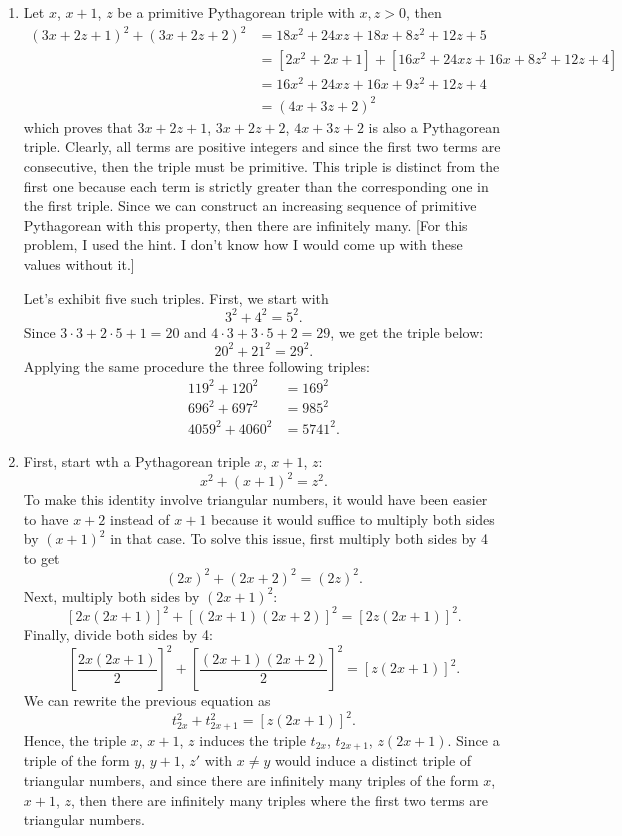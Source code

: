 \begin{solution}
    \begin{enumerate}
        \item Let $x$, $x + 1$, $z$ be a primitive Pythagorean triple with $x,z > 0$, then
        \begin{align*}
            (3x + 2z + 1)^2 + (3x + 2z + 2)^2 &= 18x^2 + 24xz + 18x + 8z^2 + 12z + 5 \\
            &= [2x^2 + 2x + 1] + [16x^2 + 24xz + 16x + 8z^2 + 12z + 4] \\
            &= 16x^2 + 24xz + 16x + 9z^2 + 12z + 4 \\
            &= (4x + 3z + 2)^2
        \end{align*}
        which proves that $3x + 2z + 1$, $3x + 2z + 2$, $4x + 3z + 2$ is also a Pythagorean triple. Clearly, all terms are positive integers and since the first two terms are consecutive, then the triple must be primitive. This triple is distinct from the first one because each term is strictly greater than the corresponding one in the first triple. Since we can construct an increasing sequence of primitive Pythagorean with this property, then there are infinitely many. [For this problem, I used the hint. I don't know how I would come up with these values without it.]

        Let's exhibit five such triples. First, we start with
        $$3^2 + 4^2 = 5^2.$$
        Since $3\cdot 3 + 2 \cdot 5 + 1 = 20$ and $4 \cdot 3 + 3\cdot 5 + 2 = 29$, we get the triple below:
        $$20^2 + 21^2 = 29^2.$$
        Applying the same procedure the three following triples:
        \begin{align*}
            119^2 + 120^2 &= 169^2 \\
            696^2 + 697^2 &= 985^2 \\
            4059^2 + 4060^2 &= 5741^2.
        \end{align*}
        \item First, start wth a Pythagorean triple $x$, $x + 1$, $z$:
        $$x^2 + (x + 1)^2 = z^2.$$
        To make this identity involve triangular numbers, it would have been easier to have $x + 2$ instead of $x + 1$ because it would suffice to multiply both sides by $(x + 1)^2$ in that case. To solve this issue, first multiply both sides by 4 to get
        $$(2x)^2 + (2x + 2)^2 = (2z)^2.$$
        Next, multiply both sides by $(2x + 1)^2$:
        $$[2x(2x + 1)]^2 + [(2x + 1)(2x + 2)]^2 = [2z(2x + 1)]^2.$$
        Finally, divide both sides by 4:
        $$\left[\frac{2x(2x + 1)}{2}\right]^2 + \left[\frac{(2x + 1)(2x + 2)}{2}\right]^2 = [z(2x + 1)]^2.$$
        We can rewrite the previous equation as
        $$t_{2x}^2 + t_{2x + 1}^2 = [z(2x + 1)]^2.$$
        Hence, the triple $x$, $x + 1$, $z$ induces the triple $t_{2x}$, $t_{2x + 1}$, $z(2x + 1)$. Since a triple of the form $y$, $y + 1$, $z'$ with $x \neq y$ would induce a distinct triple of triangular numbers, and since there are infinitely many triples of the form $x$, $x + 1$, $z$, then there are infinitely many triples where the first two terms are triangular numbers.
        

\end{enumerate}
\end{solution}
